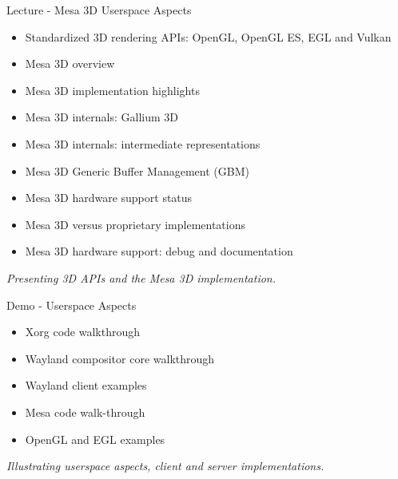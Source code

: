 \documentclass[a4paper,12pt,obeyspaces,spaces,hyphens]{article}
\begin{document}
\feagendatwocolumn
{Lecture - Mesa 3D Userspace Aspects}
{
  \begin{itemize}
  \item Standardized 3D rendering APIs: OpenGL, OpenGL ES, EGL and Vulkan
  \item Mesa 3D overview
  \item Mesa 3D implementation highlights
  \item Mesa 3D internals: Gallium 3D
  \item Mesa 3D internals: intermediate representations
  \item Mesa 3D Generic Buffer Management (GBM)
  \item Mesa 3D hardware support status
  \item Mesa 3D versus proprietary implementations
  \item Mesa 3D hardware support: debug and documentation
  \end{itemize}
  \vspace{0.5em}
  {\em Presenting 3D APIs and the Mesa 3D implementation.}
}
{Demo - Userspace Aspects}
{
  \begin{itemize}
  \item Xorg code walkthrough
  \item Wayland compositor core walkthrough
  \item Wayland client examples
  \item Mesa code walk-through
  \item OpenGL and EGL examples
  \end{itemize}
  \vspace{0.5em}
  {\em Illustrating userspace aspects, client and server implementations.}
}
\end{document}
